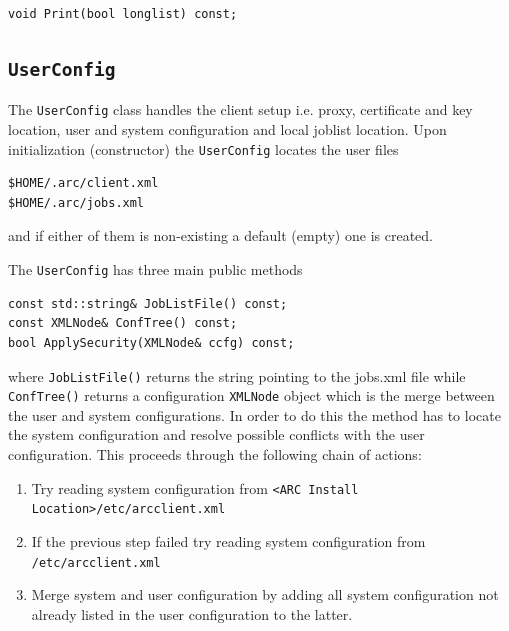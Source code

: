 \documentclass{book}
\newcommand{\UserConfig}{\texttt{UserConfig}}
\newcommand{\XMLNode}{\texttt{XMLNode}}
\begin{document}
\begin{shaded}
\begin{verbatim}
void Print(bool longlist) const;
\end{verbatim}
\end{shaded}

\subsection{{\UserConfig}}

The {\UserConfig} class handles the client setup i.e. proxy,
certificate and key location, user and system configuration and local
joblist location. Upon initialization (constructor) the {\UserConfig}
locates the user files

\begin{shaded}
\begin{verbatim}
$HOME/.arc/client.xml
$HOME/.arc/jobs.xml
\end{verbatim}
\end{shaded}

and if either of them is non-existing a default (empty) one is created.

The {\UserConfig} has three main public methods

\begin{shaded}
\begin{verbatim}
const std::string& JobListFile() const;
const XMLNode& ConfTree() const;
bool ApplySecurity(XMLNode& ccfg) const;
\end{verbatim}
\end{shaded}

where \texttt{JobListFile()} returns the string pointing to the
jobs.xml file while \texttt{ConfTree()} returns a configuration
{\XMLNode} object which is the merge between the user and system
configurations. In order to do this the method has to locate the
system configuration and resolve possible conflicts with the user
configuration. This proceeds through the following chain of actions:

\begin{enumerate}
\item{Try reading system configuration from \texttt{<ARC Install
    Location>/etc/arcclient.xml}}
\item{If the previous step failed try reading system configuration
  from \texttt{/etc/arcclient.xml}}
\item{Merge system and user configuration by adding all system
  configuration not already listed in the user configuration to the
  latter.}
\end{enumerate}
\end{document}
